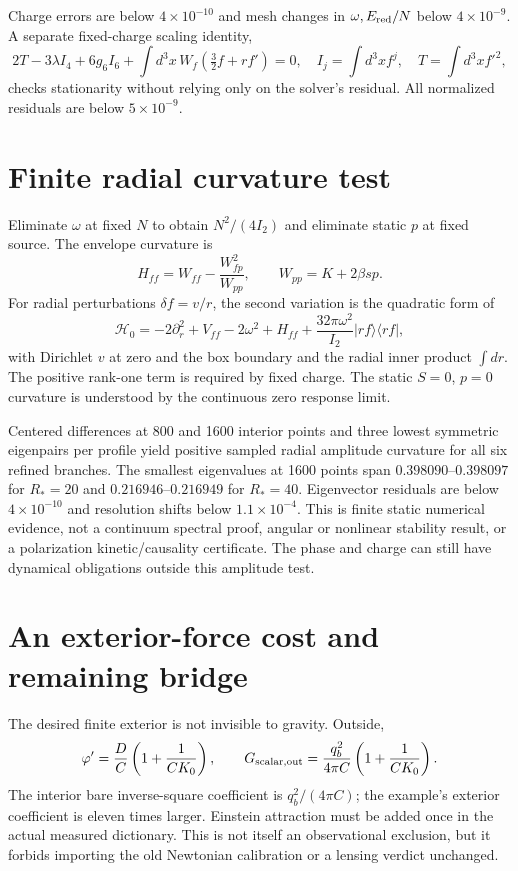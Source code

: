 \documentclass[11pt]{article}
\begin{document}
Charge errors are below $4\times10^{-10}$ and mesh changes in
$\omega,E_{\rm red}/N$ below $4\times10^{-9}$. A separate fixed-charge
scaling identity,
\begin{equation}
 2T-3\lambda I_4+6g_6 I_6+
 \int d^3x\,W_f(\tfrac32 f+r f')=0,
 \quad I_j=\int d^3x f^j,\quad T=\int d^3x f'^2,
\end{equation}
checks stationarity without relying only on the solver's residual.
All normalized residuals are below $5\times10^{-9}$.

\section{Finite radial curvature test}
Eliminate $\omega$ at fixed $N$ to obtain $N^2/(4I_2)$ and eliminate
static $p$ at fixed source. The envelope curvature is
\begin{equation}
 H_{ff}=W_{ff}-\frac{W_{fp}^2}{W_{pp}},\qquad W_{pp}=K+2\beta s p.
\end{equation}
For radial perturbations $\delta f=v/r$, the second variation is the
quadratic form of
\begin{equation}
 \mathcal H_0=-2\partial_r^2+V_{ff}-2\omega^2+H_{ff}
 +\frac{32\pi\omega^2}{I_2}|rf\rangle\langle rf|,
 \label{pi:hessian}
\end{equation}
with Dirichlet $v$ at zero and the box boundary and the radial inner
product $\int dr$. The positive rank-one term is required by fixed charge.
The static $S=0$, $p=0$ curvature is understood by the continuous zero
response limit.

Centered differences at 800 and 1600 interior points and three lowest
symmetric eigenpairs per profile yield positive sampled radial amplitude
curvature for all six refined branches. The smallest eigenvalues at 1600
points span $0.398090$--$0.398097$ for $R_*=20$ and
$0.216946$--$0.216949$ for $R_*=40$. Eigenvector residuals are below
$4\times10^{-10}$ and resolution shifts below $1.1\times10^{-4}$.
This is finite static numerical evidence, not a continuum spectral proof,
angular or nonlinear stability result, or a polarization kinetic/causality
certificate. The phase and charge can still have dynamical obligations
outside this amplitude test.

\section{An exterior-force cost and remaining bridge}
The desired finite exterior is not invisible to gravity. Outside,
\begin{equation}
 \varphi'=\frac DC\left(1+\frac{1}{CK_0}\right),\qquad
 G_{\rm scalar,out}=\frac{q_b^2}{4\pi C}
               \left(1+\frac{1}{CK_0}\right).
\end{equation}
The interior bare inverse-square coefficient is $q_b^2/(4\pi C)$;
the example's exterior coefficient is eleven times larger. Einstein
attraction must be added once in the actual measured dictionary. This is
not itself an observational exclusion, but it forbids importing the old
Newtonian calibration or a lensing verdict unchanged.
\end{document}
